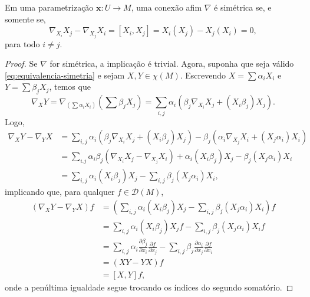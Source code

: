 \begin{proposition}
	\label{prop:conexao-simetrica-equivalencia}
	Em uma parametrização $\mathbf{x}:U\to M$, uma conexão afim $\nabla$ é simétrica se, e somente se,
	\begin{equation}
		\label{eq:equivalencia-simetria}
		\nabla_{X_{i}}X_{j}-\nabla_{X_{j}}X_{i} = \left[X_{i}, X_{j}\right]=X_{i}(X_{j})-X_{j}(X_{i})=0,
	\end{equation}
	para todo $i\neq j$.
	\begin{proof}

		Se $\nabla$ for simétrica, a implicação é trivial. Agora, suponha que seja válido \eqref{eq:equivalencia-simetria} e sejam $X,Y \in \chi(M)$. Escrevendo $X=\sum\alpha_{i}X_{i}$ e $Y=\sum\beta_{j}X_{j}$, temos que
		\begin{equation*}
			\nabla _{X}Y=\nabla_{\left( \sum\alpha_{i}X_{i} \right)}\left( \sum \beta_{j}X_{j} \right)=\sum_{i,j}\alpha_{i}(\beta_{j}\nabla_{X_{i}}X_{j}+(X_{i}\beta_{j})X_{j}).
		\end{equation*}
		Logo,
		\begin{align*}
			\nabla_{X}Y-\nabla_{Y}X & =\sum_{i,j}\alpha _{i}(\beta_{j}\nabla_{X_{i}}X_{j}+(X_{i}\beta_{j})X_{j})-\beta_{j}(\alpha_{i}\nabla_{X_{j}}X_{i}+(X_{j}\alpha_{i})X_{i}) \\
			                        & = \sum_{i.j}\alpha_{i}\beta_{j}(\nabla_{X_{i}}X_{j}-\nabla_{X_{j}}X_{i})+\alpha_{i}(X_{i}\beta_{j})X_{j}-\beta_{j}(X_{j}\alpha_{i})X_{i}   \\
			                        & = \sum_{i,j}\alpha_{i}(X_{i}\beta_{j})X_{j}- \sum_{i,j}\beta_{j}(X_{j}\alpha_{i})X_{i},
		\end{align*}
		implicando que, para qualquer $f \in \mathcal{D}(M)$,
		\begin{align*}
			(\nabla_{X}Y-\nabla_{Y}X)f & =\left( \sum_{i,j}\alpha_{i}(X_{i}\beta_{j})X_{j}- \sum_{i,j}\beta_{j}(X_{j}\alpha_{i})X_{i} \right)f                                                                                          \\
			                           & = \sum_{i,j}\alpha_{i}(X_{i}\beta_{j})X_{j}f- \sum_{i,j}\beta_{j}(X_{j}\alpha_{i})X_{i}f                                                                                                       \\
			                           & =\sum_{i,j}\alpha_{i}\frac{\partial\beta_{j}}{\partial x_{i}}\frac{\partial f}{\partial x_{j}} - \sum_{i,j}\beta_{j}\frac{\partial\alpha_{i}}{\partial x_{j}}\frac{\partial f}{\partial x_{i}} \\
			                           & = (XY-YX)f                                                                                                                                                                                     \\
			                           & = [X,Y]f,
		\end{align*}
		onde a penúltima igualdade segue trocando os índices do segundo somatório.
	\end{proof}
\end{proposition}
